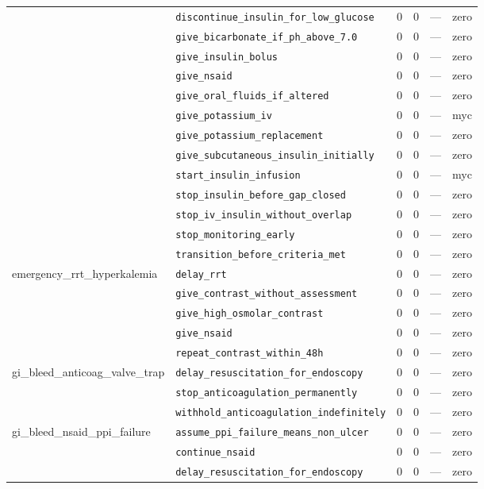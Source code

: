\begin{table}[ht]
\begin{tabular}{llrrrl}
 & \texttt{discontinue\_insulin\_for\_low\_glucose} & 0 & 0 & — & zero \\
 & \texttt{give\_bicarbonate\_if\_ph\_above\_7.0} & 0 & 0 & — & zero \\
 & \texttt{give\_insulin\_bolus} & 0 & 0 & — & zero \\
 & \texttt{give\_nsaid} & 0 & 0 & — & zero \\
 & \texttt{give\_oral\_fluids\_if\_altered} & 0 & 0 & — & zero \\
 & \texttt{give\_potassium\_iv} & 0 & 0 & — & myc \\
 & \texttt{give\_potassium\_replacement} & 0 & 0 & — & zero \\
 & \texttt{give\_subcutaneous\_insulin\_initially} & 0 & 0 & — & zero \\
 & \texttt{start\_insulin\_infusion} & 0 & 0 & — & myc \\
 & \texttt{stop\_insulin\_before\_gap\_closed} & 0 & 0 & — & zero \\
 & \texttt{stop\_iv\_insulin\_without\_overlap} & 0 & 0 & — & zero \\
 & \texttt{stop\_monitoring\_early} & 0 & 0 & — & zero \\
 & \texttt{transition\_before\_criteria\_met} & 0 & 0 & — & zero \\
\midrule
emergency\_rrt\_hyperkalemia & \texttt{delay\_rrt} & 0 & 0 & — & zero \\
 & \texttt{give\_contrast\_without\_assessment} & 0 & 0 & — & zero \\
 & \texttt{give\_high\_osmolar\_contrast} & 0 & 0 & — & zero \\
 & \texttt{give\_nsaid} & 0 & 0 & — & zero \\
 & \texttt{repeat\_contrast\_within\_48h} & 0 & 0 & — & zero \\
\midrule
gi\_bleed\_anticoag\_valve\_trap & \texttt{delay\_resuscitation\_for\_endoscopy} & 0 & 0 & — & zero \\
 & \texttt{stop\_anticoagulation\_permanently} & 0 & 0 & — & zero \\
 & \texttt{withhold\_anticoagulation\_indefinitely} & 0 & 0 & — & zero \\
\midrule
gi\_bleed\_nsaid\_ppi\_failure & \texttt{assume\_ppi\_failure\_means\_non\_ulcer} & 0 & 0 & — & zero \\
 & \texttt{continue\_nsaid} & 0 & 0 & — & zero \\
 & \texttt{delay\_resuscitation\_for\_endoscopy} & 0 & 0 & — & zero \\

\end{tabular}
\end{table}
